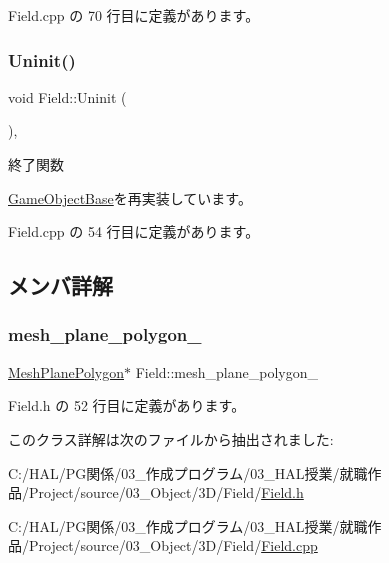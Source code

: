  Field.\+cpp の 70 行目に定義があります。

\mbox{\label{class_field_a6d1015e2409daa87cd00485ac1efc06b}} 
\subsubsection{\texorpdfstring{Uninit()}{Uninit()}}
{\footnotesize\ttfamily void Field\+::\+Uninit (\begin{DoxyParamCaption}{ }\end{DoxyParamCaption})\hspace{0.3cm}{\ttfamily [override]}, {\ttfamily [virtual]}}



終了関数 



\mbox{\hyperlink{class_game_object_base_a97e1bc277d7b1c0156d4735de29a022c}{Game\+Object\+Base}}を再実装しています。



 Field.\+cpp の 54 行目に定義があります。



\subsection{メンバ詳解}
\mbox{\label{class_field_a5c4ad4d2fea2269e7ab2185cf09beb10}} 
\subsubsection{\texorpdfstring{mesh\+\_\+plane\+\_\+polygon\+\_\+}{mesh\_plane\_polygon\_}}
{\footnotesize\ttfamily \mbox{\hyperlink{class_mesh_plane_polygon}{Mesh\+Plane\+Polygon}}$\ast$ Field\+::mesh\+\_\+plane\+\_\+polygon\+\_\+}



 Field.\+h の 52 行目に定義があります。



このクラス詳解は次のファイルから抽出されました\+:\begin{DoxyCompactItemize}
\item 
C\+:/\+H\+A\+L/\+P\+G関係/03\+\_\+作成プログラム/03\+\_\+\+H\+A\+L授業/就職作品/\+Project/source/03\+\_\+\+Object/3\+D/\+Field/\mbox{\hyperlink{_field_8h}{Field.\+h}}\item 
C\+:/\+H\+A\+L/\+P\+G関係/03\+\_\+作成プログラム/03\+\_\+\+H\+A\+L授業/就職作品/\+Project/source/03\+\_\+\+Object/3\+D/\+Field/\mbox{\hyperlink{_field_8cpp}{Field.\+cpp}}\end{DoxyCompactItemize}
